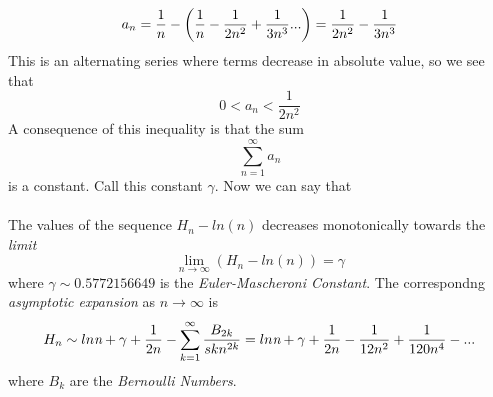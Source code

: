 \documentclass[2pt]{article}
\begin{document}
\begin{equation}
a_{n} = \frac{1}{n} - \bigg{(}\frac{1}{n} -\frac{1}{2n^2}+\frac{1}{3n^3}...\bigg{)}=\frac{1}{2n^2}-\frac{1}{3n^3}
\end{equation}
This is an alternating series where terms decrease in absolute value, so we see that
\begin{equation}
0<a_n<\frac{1}{2n^2}
\end{equation}
A consequence of this inequality is that the sum 
\begin{equation}
\sum_{n=1}^{\infty} a_n
\end{equation}
is a constant. Call this constant $\gamma$. Now we can say that
\\\\
The values of the sequence $H_{n} - ln(n)$ decreases monotonically towards the \emph{limit}
\begin{equation}
\lim_{n \to \infty} (H_{n} - ln(n)) = \gamma\nonumber
\end{equation}
where $\gamma \sim 0.5772156649$ is the \emph{Euler-Mascheroni Constant}. The correspondng \emph{asymptotic expansion} as $n \to \infty$ is
\begin{equation}
H_{n} \sim ln \emph{n} + \gamma + \frac{1}{2n}-\sum_{k=1}^{\infty} \frac{B_{2k}}{skn^{2k}}=ln \emph{n} + \gamma + \frac{1}{2n} - \frac{1}{12n^2}+\frac{1}{120n^4}-...\nonumber
\end{equation}
where $B_{k}$ are the \emph{Bernoulli Numbers}.

\nocite{*}
{}

\end{document}
